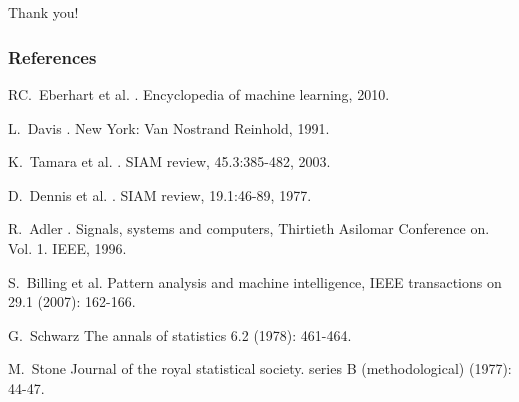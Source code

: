 \documentclass{beamer}
\begin{document}
\setcounter{framenumber}{22}
\begin{frame}
    \frametitle{$ $}
    \begin{center}
    Thank you!
    \end{center}
\end{frame}
\begin{frame}[t,allowframebreaks]
    \frametitle{References}
    \begin{thebibliography}{10}    

        \beamertemplatearticlebibitems
          RC.~Eberhart et al.
          .
          \newblock Encyclopedia of machine learning, 2010.

        \beamertemplatearticlebibitems
          L.~Davis
          .
          \newblock New York: Van Nostrand Reinhold, 1991.

        \beamertemplatearticlebibitems
          K.~Tamara et al.
          .
          \newblock SIAM review, 45.3:385-482, 2003.

        \beamertemplatearticlebibitems
          D.~Dennis et al.
          .
          \newblock SIAM review, 19.1:46-89, 1977.

        \beamertemplatearticlebibitems
          R.~Adler
          .
          \newblock Signals, systems and computers, Thirtieth Asilomar Conference on. Vol. 1. IEEE, 1996.

        \beamertemplatearticlebibitems
          S.~Billing et al.
          \newblock Pattern analysis and machine intelligence, IEEE transactions on 29.1 (2007): 162-166.

        \beamertemplatearticlebibitems
          G.~Schwarz
          \newblock The annals of statistics 6.2 (1978): 461-464.

        \beamertemplatearticlebibitems
          M.~Stone
          \newblock Journal of the royal statistical society. series B (methodological) (1977): 44-47.


\end{thebibliography}
\end{frame}
\end{document}
